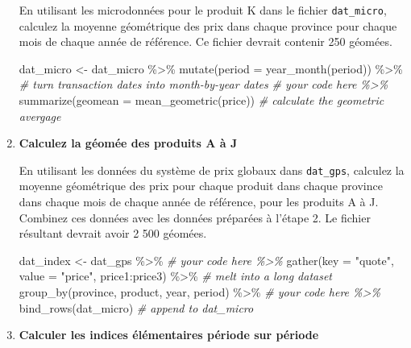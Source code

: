 \documentclass[
]{article}
\newenvironment{Shaded}{\begin{snugshade}}{\end{snugshade}}
\newcommand{\AttributeTok}[1]{\textcolor[rgb]{0.77,0.63,0.00}{#1}}
\newcommand{\CommentTok}[1]{\textcolor[rgb]{0.56,0.35,0.01}{\textit{#1}}}
\newcommand{\FunctionTok}[1]{\textcolor[rgb]{0.00,0.00,0.00}{#1}}
\newcommand{\NormalTok}[1]{#1}
\newcommand{\OtherTok}[1]{\textcolor[rgb]{0.56,0.35,0.01}{#1}}
\newcommand{\SpecialCharTok}[1]{\textcolor[rgb]{0.00,0.00,0.00}{#1}}
\newcommand{\StringTok}[1]{\textcolor[rgb]{0.31,0.60,0.02}{#1}}
\begin{document}
\begin{enumerate}
  En utilisant les microdonnées pour le produit K dans le fichier \texttt{dat\_micro}, calculez la moyenne géométrique des prix dans chaque province pour chaque mois de chaque année de référence. Ce fichier devrait contenir 250 géomées.

\begin{Shaded}
\begin{Highlighting}[]
\NormalTok{dat\_micro }\OtherTok{\textless{}{-}}\NormalTok{ dat\_micro }\SpecialCharTok{\%\textgreater{}\%}
  \FunctionTok{mutate}\NormalTok{(}\AttributeTok{period =} \FunctionTok{year\_month}\NormalTok{(period)) }\SpecialCharTok{\%\textgreater{}\%} \CommentTok{\# turn transaction dates into month{-}by{-}year dates}
  \CommentTok{\# your code here \%\textgreater{}\%}
  \FunctionTok{summarize}\NormalTok{(}\AttributeTok{geomean =} \FunctionTok{mean\_geometric}\NormalTok{(price)) }\CommentTok{\# calculate the geometric avergage}
\end{Highlighting}
\end{Shaded}
\item
  \textbf{Calculez la géomée des produits A à J}

  En utilisant les données du système de prix globaux dans \texttt{dat\_gps}, calculez la moyenne géométrique des prix pour chaque produit dans chaque province dans chaque mois de chaque année de référence, pour les produits A à J. Combinez ces données avec les données préparées à l'étape 2. Le fichier résultant devrait avoir 2 500 géomées.

\begin{Shaded}
\begin{Highlighting}[]
\NormalTok{dat\_index }\OtherTok{\textless{}{-}}\NormalTok{ dat\_gps }\SpecialCharTok{\%\textgreater{}\%}
  \CommentTok{\# your code here \%\textgreater{}\%}
  \FunctionTok{gather}\NormalTok{(}\AttributeTok{key =} \StringTok{"quote"}\NormalTok{, }\AttributeTok{value =} \StringTok{"price"}\NormalTok{, price1}\SpecialCharTok{:}\NormalTok{price3) }\SpecialCharTok{\%\textgreater{}\%} \CommentTok{\# melt into a long dataset}
  \FunctionTok{group\_by}\NormalTok{(province, product, year, period) }\SpecialCharTok{\%\textgreater{}\%}
  \CommentTok{\# your code here \%\textgreater{}\%}
  \FunctionTok{bind\_rows}\NormalTok{(dat\_micro) }\CommentTok{\# append to dat\_micro}
\end{Highlighting}
\end{Shaded}
\item
  \textbf{Calculer les indices élémentaires période sur période}


\end{enumerate}
\end{document}
